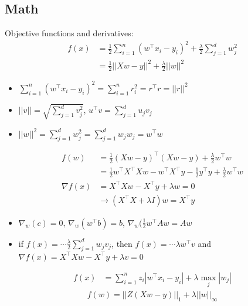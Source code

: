 \documentclass[10pt,landscape,a4paper]{article}
\begin{document}
\begin{multicols*}{5}
\section{Math}
Objective functions and derivatives:
\begin{align*}
   f(x) &= \frac{1}{2}\sum\limits_{i=1}^{n} (w^\intercal x_i - y_i)^2 + \frac{\lambda}{2} \sum\limits_{j=1}^{d} w_j^2 \\
   &= \frac{1}{2} ||Xw-y||^2 + \frac{\lambda}{2} ||w||^2
\end{align*}
\begin{itemize}
    \item \(\sum\limits_{i=1}^{n} (w^\intercal x_i - y_i)^2 = \sum\limits_{i=1}^{n} r_i^2 = r^\intercal r = ||r||^2\)
    \item \(||v|| = \sqrt{\sum\limits_{j=1}^{d} v_j^2}\), \(u^\intercal v = \sum\limits_{j=1}^{d} u_j v_j\)
    \item \(||w||^2 = \sum\limits_{j=1}^{d} w_j^2 = \sum\limits_{j=1}^{d} w_j w_j = w^\intercal w \)
\end{itemize}
\begin{align*}
    f(w) &= \frac{1}{2} (Xw-y)^\intercal (Xw-y) + \frac{\lambda}{2} w^\intercal w \\
    &= \frac{1}{2} w^\intercal X^\intercal Xw - w^\intercal X^\intercal y - \frac{1}{2} y^\intercal y + \frac{\lambda}{2} w^\intercal w \\
    \nabla f(x) &= X^\intercal Xw - X^\intercal y + \lambda w = 0 \\
    & \rightarrow (X^\intercal X + \lambda I) w = X^\intercal y
\end{align*}
\begin{itemize}
    \item \(\nabla_w (c) = 0\), \(\nabla_w (w^\intercal b) = b\), \(\nabla_w (\frac{1}{2} w^\intercal A w = Aw\)
\end{itemize}
\begin{itemize}
    \item if \(f(x) = \cdots \frac{\lambda}{2} \sum\limits_{j=1}^{d} w_j v_j\), then \(f(x) = \cdots \lambda w^\intercal v\) and \(\nabla f(x) = X^\intercal Xw - X^\intercal y + \lambda v = 0\)
\end{itemize}
\begin{align*}
    f(x) &= \sum\limits_{i=1}^{n} z_i |w^\intercal x_i - y_i| + \lambda \max_j |w_j|
\end{align*}
\begin{align*}
    f(w) = ||Z(Xw - y)||_1 + \lambda ||w||_{\infty}
\end{align*}
\end{multicols*}
\end{document}
